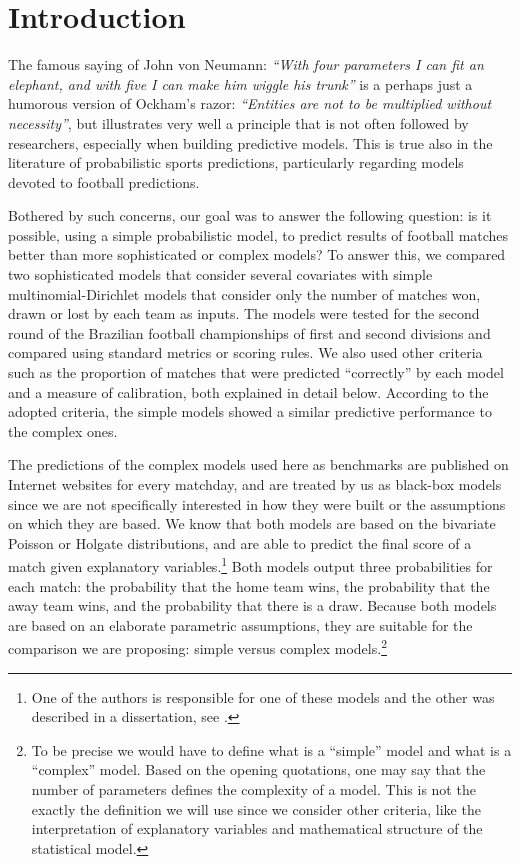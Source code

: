 \documentclass[journal,article,accept,moreauthors,pdftex,12pt,a4paper]{mdpi}
\begin{document}

\section{Introduction}

The famous saying of John von Neumann: {\it ``With four parameters I can fit an elephant, and with five I can make him wiggle his trunk''} is a perhaps just a humorous version of Ockham's razor: 
{\it``Entities are not to be multiplied without necessity''}, but illustrates very well a principle that is not often followed by researchers, especially when building predictive models. 
This is true also in the literature of probabilistic sports predictions, particularly regarding models devoted to football predictions.

Bothered by such concerns, our goal was to answer the following question: is it possible, using a simple probabilistic model, to predict results of football matches better than more sophisticated or complex models?
To answer this, we compared two sophisticated models that consider several covariates with simple multinomial-Dirichlet models that consider only the number of matches won, drawn or lost by each team as inputs.
The models were tested for the second round of the Brazilian football championships of first and second divisions and compared using standard metrics or scoring rules.
We also used other criteria such as the proportion of matches that were predicted ``correctly'' by each model and a measure of calibration, both explained in detail below.
According to the adopted criteria, the simple models showed a similar predictive performance to the complex ones.

The predictions of the complex models used here as benchmarks are published on Internet websites for every matchday, and are treated by us as black-box models since we are not specifically interested in how they were built or the assumptions on which they are based.
We know that both models are based on the bivariate Poisson or Holgate distributions, and are able to predict the final score of a match given explanatory variables.\footnote{One of the authors is responsible for one of these models and the other was described in a dissertation, see \cite{arruda2000}.}
Both models output three probabilities for each match: the probability that the home team wins, the probability that the away team wins, and the probability that there is a draw.
Because both models are based on an elaborate parametric assumptions, they are suitable for the comparison we are proposing: simple versus complex models.\footnote{To be precise we would have to define what is a ``simple'' model and what is a ``complex'' model. Based on the opening quotations, one may say that the number of parameters defines the complexity of a model. This is not the exactly the definition we will use since we consider other criteria, like the interpretation of explanatory variables and mathematical structure of the statistical model.} 
\end{document}
